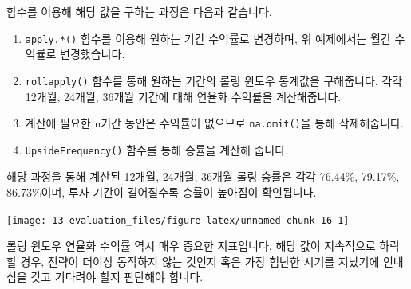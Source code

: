 \documentclass[12pt,]{book}
\newenvironment{Shaded}{\begin{snugshade}}{\end{snugshade}}
\newcommand{\DataTypeTok}[1]{\textcolor[rgb]{0.13,0.29,0.53}{#1}}
\newcommand{\DecValTok}[1]{\textcolor[rgb]{0.00,0.00,0.81}{#1}}
\newcommand{\KeywordTok}[1]{\textcolor[rgb]{0.13,0.29,0.53}{\textbf{#1}}}
\newcommand{\NormalTok}[1]{#1}
\newcommand{\OperatorTok}[1]{\textcolor[rgb]{0.81,0.36,0.00}{\textbf{#1}}}
\newcommand{\OtherTok}[1]{\textcolor[rgb]{0.56,0.35,0.01}{#1}}
\newcommand{\StringTok}[1]{\textcolor[rgb]{0.31,0.60,0.02}{#1}}
\providecommand{\tightlist}{%
  \setlength{\itemsep}{0pt}\setlength{\parskip}{0pt}}
\begin{document}
함수를 이용해 해당 값을 구하는 과정은 다음과 같습니다.

\begin{enumerate}
\def\labelenumi{\arabic{enumi}.}
\tightlist
\item
  \texttt{apply.*()} 함수를 이용해 원하는 기간 수익률로 변경하며, 위 예제에서는 월간 수익률로 변경했습니다.
\item
  \texttt{rollapply()} 함수를 통해 원하는 기간의 롤링 윈도우 통계값을 구해줍니다. 각각 12개월, 24개월, 36개월 기간에 대해 연율화 수익률을 계산해줍니다.
\item
  계산에 필요한 n기간 동안은 수익률이 없으므로 \texttt{na.omit()}을 통해 삭제해줍니다.
\item
  \texttt{UpsideFrequency()} 함수를 통해 승률을 계산해 줍니다.
\end{enumerate}

해당 과정을 통해 계산된 12개월, 24개월, 36개월 롤링 승률은 각각 76.44\%, 79.17\%, 86.73\%이며, 투자 기간이 길어질수록 승률이 높아짐이 확인됩니다.

\begin{Shaded}
\end{Shaded}

\begin{center}\texttt{[image: 13-evaluation\_files/figure-latex/unnamed-chunk-16-1]} \end{center}

롤링 윈도우 연율화 수익률 역시 매우 중요한 지표입니다. 해당 값이 지속적으로 하락할 경우, 전략이 더이상 동작하지 않는 것인지 혹은 가장 험난한 시기를 지났기에 인내심을 갖고 기다려야 할지 판단해야 합니다.
\end{document}
